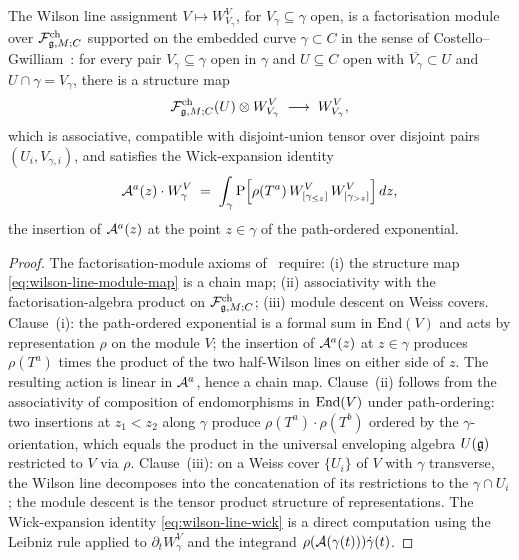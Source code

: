 \begin{theorem}
\label{thm:ch-ce-wilson-line-module}
%
The Wilson line assignment $V\mapsto W^V_{V_\gamma}$, for
$V_\gamma\subseteq\gamma$ open, is a factorisation module over
$\mathcal{F}^{\mathrm{ch}}_{\mathfrak{g},M;C}$ supported on the embedded curve
$\gamma\subset C$ in the sense of
Costello--Gwilliam~\cite[Def.\,3.5.1]{CG17}: for every pair
$V_\gamma\subseteq\gamma$ open in $\gamma$ and $U\subseteq C$ open
with $\overline{V_\gamma}\subset U$ and $U\cap\gamma = V_\gamma$,
there is a structure map
\begin{equation}
\label{eq:wilson-line-module-map}
\mathcal{F}^{\mathrm{ch}}_{\mathfrak{g},M;C}(U)\otimes W^V_{V_\gamma}
\;\longrightarrow\;
W^V_{V_\gamma},
\end{equation}
which is associative, compatible with disjoint-union tensor over
disjoint pairs $(U_i,V_{\gamma,i})$, and satisfies the Wick-expansion
identity
\begin{equation}
\label{eq:wilson-line-wick}
\mathcal{A}^a(z)\cdot W^V_\gamma
\;=\;
\int_\gamma \mathrm{P}\Bigl[\rho(T^a)\,W^V_{[\gamma_{\le z}]}\,
W^V_{[\gamma_{>z}]}\Bigr]\,dz,
\end{equation}
the insertion of $\mathcal{A}^a(z)$ at the point $z\in\gamma$ of the
path-ordered exponential.
\end{theorem}

\begin{proof}
The factorisation-module axioms of~\cite[Def.\,3.5.1]{CG17} require:
(i) the structure map \eqref{eq:wilson-line-module-map} is a chain
map; (ii) associativity with the factorisation-algebra product on
$\mathcal{F}^{\mathrm{ch}}_{\mathfrak{g},M;C}$; (iii) module descent on Weiss covers.
Clause~(i): the path-ordered exponential is a formal sum in
$\mathrm{End}(V)$ and acts by representation $\rho$ on the module
$V$; the insertion of $\mathcal{A}^a(z)$ at $z\in\gamma$ produces
$\rho(T^a)$ times the product of the two half-Wilson lines on either
side of $z$. The resulting action is linear in $\mathcal{A}^a$, hence a chain
map. Clause~(ii) follows from the associativity of composition of
endomorphisms in $\mathrm{End}(V)$ under path-ordering: two insertions at
$z_1 < z_2$ along $\gamma$ produce
$\rho(T^a)\cdot\rho(T^b)$ ordered by the $\gamma$-orientation, which
equals the product in the universal enveloping algebra $U(\mathfrak{g})$
restricted to $V$ via $\rho$. Clause~(iii): on a Weiss cover
$\{U_i\}$ of $V$ with $\gamma$ transverse, the Wilson line decomposes
into the concatenation of its restrictions to the $\gamma\cap U_i$; the
module descent is the tensor product structure of representations.
The Wick-expansion identity \eqref{eq:wilson-line-wick} is a direct
computation using the Leibniz rule applied to $\partial_t W^V_\gamma$
and the integrand $\rho(\mathcal{A}(\gamma(t)))\dot\gamma(t)$.
\end{proof}

